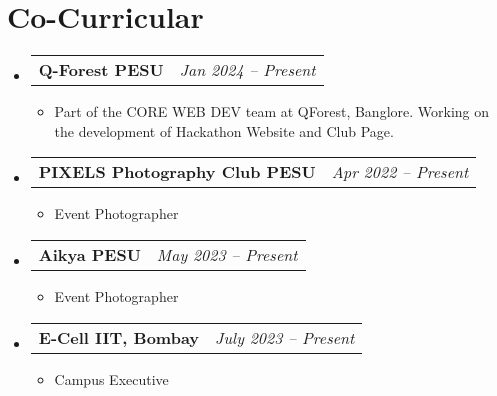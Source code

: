 \documentclass[letterpaper,10pt]{article}
\makeatletter
\newcommand{\subheadingtitlevspace}{
\vspace{-3pt}
}
\newcommand{\resumeItem}[1]{
  \item{
    {#1 \vspace{-4pt}}
  }
}
\newcommand{\titleItem}[1]{
  \textbf{#1}
}
\newcommand{\resumeProjectHeading}[2]{
    \item
    \begin{tabular*}{0.97\textwidth}{l@{\extracolsep{\fill}}r}
      #1 & \textit{ #2} \\
    \end{tabular*}\vspace{-9pt}
}
\newcommand{\resumeSubHeadingListStart}{\subheadingtitlevspace\begin{itemize}[leftmargin=0.15in, label={}]}
\newcommand{\resumeSubHeadingListEnd}{\end{itemize}}
\newcommand{\resumeItemListStart}{
\begin{itemize}}
\newcommand{\resumeItemListEnd}{
\end{itemize}\vspace{-8pt}}
\makeatother
\begin{document}

\section{Co-Curricular}
  \resumeSubHeadingListStart
    \resumeProjectHeading
           {\titleItem{{Q-Forest PESU}}}{Jan 2024 -- Present}
      \resumeItemListStart    
    \resumeItem{Part of the CORE WEB DEV team at QForest, Banglore. Working on the development of Hackathon Website and Club Page.}
    \resumeItemListEnd
  \resumeProjectHeading
           {\titleItem{{PIXELS Photography Club PESU}}}{Apr 2022 -- Present}
      \resumeItemListStart    
    \resumeItem{Event Photographer}
    \resumeItemListEnd
    \resumeProjectHeading
           {\titleItem{Aikya PESU}}{May 2023 -- Present}
      \resumeItemListStart    
    \resumeItem{Event Photographer}
    \resumeItemListEnd
    \resumeProjectHeading
           {\titleItem{E-Cell IIT, Bombay}}{July 2023 -- Present}
      \resumeItemListStart    
    \resumeItem{Campus Executive}
    \resumeItemListEnd
  \resumeSubHeadingListEnd

\end{document}
